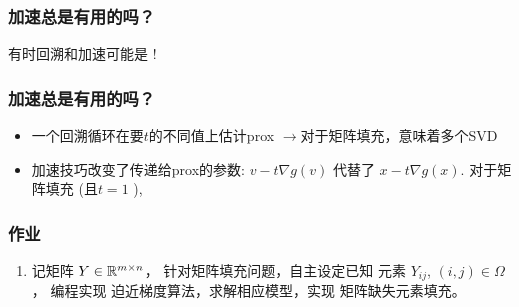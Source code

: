 \documentclass[handout]{beamer}
\begin{document}
\begin{frame}

\frametitle{加速总是有用的吗？}

有时回溯和加速可能是 !

\end{frame}
\begin{frame}

\frametitle{加速总是有用的吗？}

\begin{itemize}[<+->]
  \item 一个回溯循环在要$t$的不同值上估计prox $\rightarrow$对于矩阵填充，意味着多个SVD 

  \item 加速技巧改变了传递给prox的参数: $v-t \nabla g(v)$ 代替了 $x-t \nabla g(x)$. 对于矩阵填充 (且$t=1$ ),

\end{itemize}


\end{frame}


\begin{frame}
\frametitle{作业}

\begin{enumerate}
	\item 记矩阵 $Y\in \mathbb{R}^{m\times n}$，
	   针对矩阵填充问题，自主设定已知 元素 $Y_{ij}$, $(i,j)\in \Omega$，
	   编程实现 迫近梯度算法，求解相应模型，实现 矩阵缺失元素填充。
	   
\end{enumerate}
\end{frame}
\end{document}
